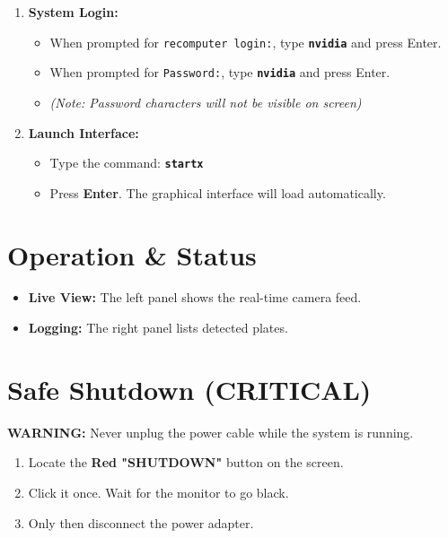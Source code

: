 \documentclass[a4paper,10pt]{article}
\begin{document}
	\begin{enumerate}[leftmargin=*, itemsep=2pt, topsep=2pt]
		\item \textbf{System Login:}
		\begin{itemize}[noitemsep, topsep=0pt]
			\item When prompted for \texttt{recomputer login:}, type \textbf{\texttt{nvidia}} and press Enter.
			\item When prompted for \texttt{Password:}, type \textbf{\texttt{nvidia}} and press Enter.
			\item \textit{(Note: Password characters will not be visible on screen)}
		\end{itemize}
		
		\item \textbf{Launch Interface:}
		\begin{itemize}[noitemsep, topsep=0pt]
			\item Type the command: \textbf{\texttt{startx}}
			\item Press \textbf{Enter}. The graphical interface will load automatically.
		\end{itemize}
	\end{enumerate}
	
	\section{Operation \& Status}
	\begin{itemize}[leftmargin=*, itemsep=2pt]
		\item \textbf{Live View:} The left panel shows the real-time camera feed.
		\item \textbf{Logging:} The right panel lists detected plates.
	\end{itemize}
	
	\section{Safe Shutdown (CRITICAL)}
	\textbf{WARNING:} Never unplug the power cable while the system is running.
	
	\begin{enumerate}[leftmargin=*, itemsep=2pt, topsep=2pt]
		\item Locate the \textbf{Red "SHUTDOWN"} button on the screen.
		\item Click it once. Wait for the monitor to go black.
		\item Only then disconnect the power adapter.
	\end{enumerate}
	
\end{document}
